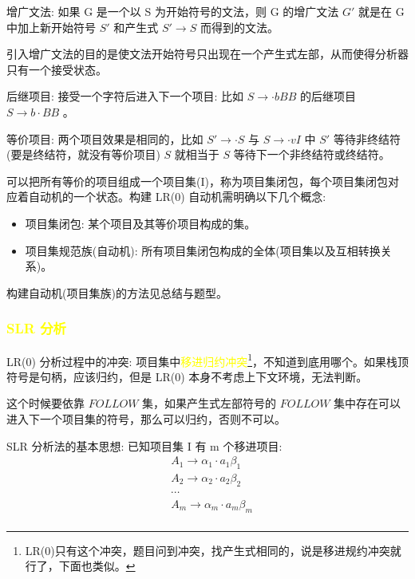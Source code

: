 增广文法: 如果 G 是一个以 S 为开始符号的文法，则 G 的增广文法 $G'$ 就是在 G 中加上新开始符号 $S'$ 和产生式 $S' \rightarrow S$ 而得到的文法。

引入增广文法的目的是使文法开始符号只出现在一个产生式左部，从而使得分析器只有一个接受状态。

后继项目: 接受一个字符后进入下一个项目: 比如 $ S \rightarrow \cdot bBB $ 的后继项目 $S \rightarrow b\cdot BB$ 。

等价项目: 两个项目效果是相同的，比如 $S' \rightarrow \cdot S$ 与 $S \rightarrow \cdot vI$ 中 $S'$ 等待非终结符(要是终结符，就没有等价项目) $S$ 就相当于 $S$ 等待下一个非终结符或终结符。

可以把所有等价的项目组成一个项目集(I)，称为项目集闭包，每个项目集闭包对应着自动机的一个状态。构建 LR(0) 自动机需明确以下几个概念:
\begin{itemize}
    \item 项目集闭包: 某个项目及其等价项目构成的集。
    \item 项目集规范族(自动机): 所有项目集闭包构成的全体(项目集以及互相转换关系)。
\end{itemize}

构建自动机(项目集族)的方法见总结与题型。

\subsubsection{\textcolor{mark}{SLR 分析}}

LR(0) 分析过程中的冲突: 项目集中\textcolor{mark}{移进归约冲突}\footnote{LR(0)只有这个冲突，题目问到冲突，找产生式相同的，说是移进规约冲突就行了，下面也类似。}，不知道到底用哪个。如果栈顶符号是句柄，应该归约，但是 LR(0) 本身不考虑上下文环境，无法判断。

这个时候要依靠 $FOLLOW$ 集，\textcolor{imp}{如果产生式左部符号的 $FOLLOW$ 集中存在可以进入下一个项目集的符号，那么可以归约，否则不可以。}

SLR 分析法的基本思想:
已知项目集 I 有 m 个移进项目:
\begin{equation}
    \begin{aligned}
         & A_1 \rightarrow \alpha_1 \cdot a_1 \beta_1 \\
         & A_2 \rightarrow \alpha_2 \cdot a_2 \beta_2 \\
         & \cdots                                     \\
         & A_m \rightarrow \alpha_m \cdot a_m \beta_m \\
         & \nonumber
    \end{aligned}
\end{equation}

